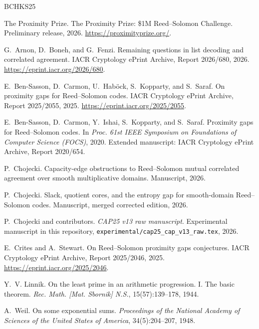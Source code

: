 \documentclass[a4paper,11pt]{amsart}
\theoremstyle{remark}
\begin{document}
\begin{thebibliography}{BCHKS25}

The Proximity Prize.
\newblock The Proximity Prize: \$1M Reed--Solomon Challenge.
\newblock Preliminary release, 2026.
\newblock \url{https://proximityprize.org/}.

G.~Arnon, D.~Boneh, and G.~Fenzi.
\newblock Remaining questions in list decoding and correlated agreement.
\newblock IACR Cryptology ePrint Archive, Report 2026/680, 2026.
\newblock \url{https://eprint.iacr.org/2026/680}.

E.~Ben-Sasson, D.~Carmon, U.~Hab{\"o}ck, S.~Kopparty, and S.~Saraf.
\newblock On proximity gaps for Reed--Solomon codes.
\newblock IACR Cryptology ePrint Archive, Report 2025/2055, 2025.
\newblock \url{https://eprint.iacr.org/2025/2055}.

E.~Ben-Sasson, D.~Carmon, Y.~Ishai, S.~Kopparty, and S.~Saraf.
\newblock Proximity gaps for Reed--Solomon codes.
\newblock In \emph{Proc. 61st IEEE Symposium on Foundations of Computer Science (FOCS)}, 2020.
\newblock Extended manuscript: IACR Cryptology ePrint Archive, Report 2020/654.

P.~Chojecki.
\newblock Capacity-edge obstructions to Reed--Solomon mutual correlated agreement over smooth multiplicative domains.
\newblock Manuscript, 2026.

P.~Chojecki.
\newblock Slack, quotient cores, and the entropy gap for smooth-domain Reed--Solomon codes.
\newblock Manuscript, merged corrected edition, 2026.

P.~Chojecki and contributors.
\newblock \emph{CAP25 v13 raw manuscript}.
\newblock Experimental manuscript in this repository, \texttt{experimental/cap25\_cap\_v13\_raw.tex}, 2026.

E.~Crites and A.~Stewart.
\newblock On Reed--Solomon proximity gaps conjectures.
\newblock IACR Cryptology ePrint Archive, Report 2025/2046, 2025.
\newblock \url{https://eprint.iacr.org/2025/2046}.

Y.~V. Linnik.
\newblock On the least prime in an arithmetic progression. I. The basic theorem.
\newblock \emph{Rec. Math. [Mat. Sbornik] N.S.}, 15(57):139--178, 1944.

A.~Weil.
\newblock On some exponential sums.
\newblock \emph{Proceedings of the National Academy of Sciences of the United States of America}, 34(5):204--207, 1948.

\end{thebibliography}
\end{document}
